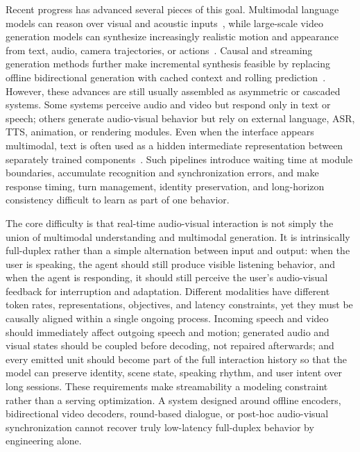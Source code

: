 \documentclass{llmxive}
\begin{document}
Recent progress has advanced several pieces of this goal. Multimodal language models can reason over visual and acoustic inputs~\cite{bai2025qwen2.5vl,team2025kimi-vl,hong2025glm4.5v}, while large-scale video generation models can synthesize increasingly realistic motion and appearance from text, audio, camera trajectories, or actions~\cite{wan2025wan,seedance2026seedance,yang2025cogvideox,ding2025kling-avatar,bai2025recammaster,matrixgame2026}. Causal and streaming generation methods further make incremental synthesis feasible by replacing offline bidirectional generation with cached context and rolling prediction~\citep{huang2025selfforcing,chen2024diffusionforcing,talkingmachines2025}. However, these advances are still usually assembled as asymmetric or cascaded systems. Some systems perceive audio and video but respond only in text or speech; others generate audio-visual behavior but rely on external language, ASR, TTS, animation, or rendering modules. Even when the interface appears multimodal, text is often used as a hidden intermediate representation between separately trained components~\cite{mavid2025,mio2025}. Such pipelines introduce waiting time at module boundaries, accumulate recognition and synchronization errors, and make response timing, turn management, identity preservation, and long-horizon consistency difficult to learn as part of one behavior.

The core difficulty is that real-time audio-visual interaction is not simply the union of multimodal understanding and multimodal generation. It is intrinsically full-duplex rather than a simple alternation between input and output: when the user is speaking, the agent should still produce visible listening behavior, and when the agent is responding, it should still perceive the user's audio-visual feedback for interruption and adaptation. Different modalities have different token rates, representations, objectives, and latency constraints, yet they must be causally aligned within a single ongoing process. Incoming speech and video should immediately affect outgoing speech and motion; generated audio and visual states should be coupled before decoding, not repaired afterwards; and every emitted unit should become part of the full interaction history so that the model can preserve identity, scene state, speaking rhythm, and user intent over long sessions. These requirements make streamability a modeling constraint rather than a serving optimization. A system designed around offline encoders, bidirectional video decoders, round-based dialogue, or post-hoc audio-visual synchronization cannot recover truly low-latency full-duplex behavior by engineering alone.
\end{document}
